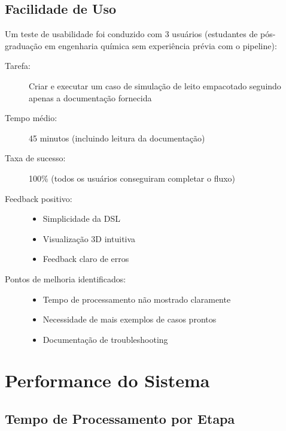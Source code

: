 \subsection{Facilidade de Uso}

Um teste de usabilidade foi conduzido com 3 usuários (estudantes de pós-graduação em engenharia química sem experiência prévia com o pipeline):

\begin{description}
    \item[Tarefa:] Criar e executar um caso de simulação de leito empacotado seguindo apenas a documentação fornecida
    
    \item[Tempo médio:] 45 minutos (incluindo leitura da documentação)
    
    \item[Taxa de sucesso:] 100\% (todos os usuários conseguiram completar o fluxo)
    
    \item[Feedback positivo:] 
    \begin{itemize}
        \item Simplicidade da DSL
        \item Visualização 3D intuitiva
        \item Feedback claro de erros
    \end{itemize}
    
    \item[Pontos de melhoria identificados:] 
    \begin{itemize}
        \item Tempo de processamento não mostrado claramente
        \item Necessidade de mais exemplos de casos prontos
        \item Documentação de troubleshooting
    \end{itemize}
\end{description}

\section{Performance do Sistema}

\subsection{Tempo de Processamento por Etapa}

